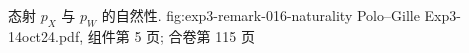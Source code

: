   {态射 \(p_X\) 与 \(p_W\) 的自然性.}
  {fig:exp3-remark-016-naturality}
  {Polo--Gille Exp3-14oct24.pdf, 组件第 5 页; 合卷第 115 页}

